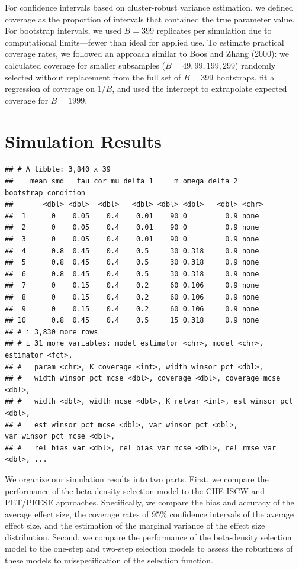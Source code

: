 \documentclass[
  man, donotrepeattitle,floatsintext]{apa7}
\begin{document}
For confidence intervals based on cluster-robust variance estimation, we defined coverage as the proportion of intervals that contained the true parameter value. For bootstrap intervals, we used \(B = 399\) replicates per simulation due to computational limits---fewer than ideal for applied use. To estimate practical coverage rates, we followed an approach similar to Boos and Zhang (2000): we calculated coverage for smaller subsamples (\(B = 49, 99, 199, 299\)) randomly selected without replacement from the full set of \(B = 399\) bootstraps, fit a regression of coverage on \(1/B\), and used the intercept to extrapolate expected coverage for \(B = 1999\).

\section{Simulation Results}\label{simulation-results}

\begin{verbatim}
## # A tibble: 3,840 x 39
##    mean_smd   tau cor_mu delta_1     m omega delta_2 bootstrap_condition
##       <dbl> <dbl>  <dbl>   <dbl> <dbl> <dbl>   <dbl> <chr>              
##  1      0    0.05    0.4    0.01    90 0         0.9 none               
##  2      0    0.05    0.4    0.01    90 0         0.9 none               
##  3      0    0.05    0.4    0.01    90 0         0.9 none               
##  4      0.8  0.45    0.4    0.5     30 0.318     0.9 none               
##  5      0.8  0.45    0.4    0.5     30 0.318     0.9 none               
##  6      0.8  0.45    0.4    0.5     30 0.318     0.9 none               
##  7      0    0.15    0.4    0.2     60 0.106     0.9 none               
##  8      0    0.15    0.4    0.2     60 0.106     0.9 none               
##  9      0    0.15    0.4    0.2     60 0.106     0.9 none               
## 10      0.8  0.45    0.4    0.5     15 0.318     0.9 none               
## # i 3,830 more rows
## # i 31 more variables: model_estimator <chr>, model <chr>, estimator <fct>,
## #   param <chr>, K_coverage <int>, width_winsor_pct <dbl>,
## #   width_winsor_pct_mcse <dbl>, coverage <dbl>, coverage_mcse <dbl>,
## #   width <dbl>, width_mcse <dbl>, K_relvar <int>, est_winsor_pct <dbl>,
## #   est_winsor_pct_mcse <dbl>, var_winsor_pct <dbl>, var_winsor_pct_mcse <dbl>,
## #   rel_bias_var <dbl>, rel_bias_var_mcse <dbl>, rel_rmse_var <dbl>, ...
\end{verbatim}

We organize our simulation results into two parts. First, we compare the performance of the beta-density selection model to the CHE-ISCW and PET/PEESE approaches. Specifically, we compare the bias and accuracy of the average effect size, the coverage rates of 95\% confidence intervals of the average effect size, and the estimation of the marginal variance of the effect size distribution. Second, we compare the performance of the beta-density selection model to the one-step and two-step selection models to assess the robustness of these models to misspecification of the selection function.
\end{document}
